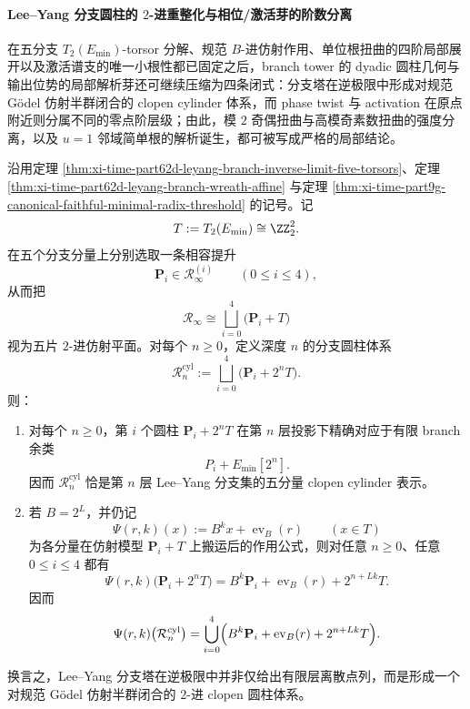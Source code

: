 \paragraph{Lee--Yang 分支圆柱的 \texorpdfstring{$2$}{2}-进重整化与相位/激活芽的阶数分离}
在五分支 \(T_2(E_{\min})\)-torsor 分解、规范 \(B\)-进仿射作用、单位根扭曲的四阶局部展开以及激活谱支的唯一小根性都已固定之后，branch tower 的 dyadic 圆柱几何与输出位势的局部解析芽还可继续压缩为四条闭式：分支塔在逆极限中形成对规范 Gödel 仿射半群闭合的 clopen cylinder 体系，而 phase twist 与 activation 在原点附近则分属不同的零点阶层级；由此，模 \(2\) 奇偶扭曲与高模奇素数扭曲的强度分离，以及 \(u=1\) 邻域简单根的解析诞生，都可被写成严格的局部结论。

\begin{theorem}\label{thm:xi-time-part62dg-leyang-cylinder-affine-renormalization}
沿用定理 \ref{thm:xi-time-part62d-leyang-branch-inverse-limit-five-torsors}、定理 \ref{thm:xi-time-part62d-leyang-branch-wreath-affine} 与定理 \ref{thm:xi-time-part9g-canonical-faithful-minimal-radix-threshold} 的记号。记
\[
T:=T_2(E_{\min})\cong \ZZ_2^2.
\]
在五个分支分量上分别选取一条相容提升
\[
\mathbf P_i\in \mathcal R_\infty^{(i)}
\qquad (0\le i\le 4),
\]
从而把
\[
\mathcal R_\infty
\cong
\bigsqcup_{i=0}^{4}\bigl(\mathbf P_i+T\bigr)
\]
视为五片 \(2\)-进仿射平面。对每个 \(n\ge 0\)，定义深度 \(n\) 的分支圆柱体系
\[
\mathcal R_n^{\mathrm{cyl}}
:=
\bigsqcup_{i=0}^{4}\bigl(\mathbf P_i+2^nT\bigr).
\]
则：
\begin{enumerate}
  \item 对每个 \(n\ge 0\)，第 \(i\) 个圆柱 \(\mathbf P_i+2^nT\) 在第 \(n\) 层投影下精确对应于有限 branch 余类
  \[
  P_i+E_{\min}[2^n].
  \]
  因而 \(\mathcal R_n^{\mathrm{cyl}}\) 恰是第 \(n\) 层 Lee--Yang 分支集的五分量 clopen cylinder 表示。
  \item 若 \(B=2^L\)，并仍记
  \[
  \Psi(r,k)(x):=B^k x+\operatorname{ev}_B(r)
  \qquad (x\in T)
  \]
  为各分量在仿射模型 \(\mathbf P_i+T\) 上搬运后的作用公式，则对任意 \(n\ge 0\)、任意 \(0\le i\le 4\) 都有
  \[
  \Psi(r,k)\bigl(\mathbf P_i+2^nT\bigr)
  =
  B^k\mathbf P_i+\operatorname{ev}_B(r)+2^{n+Lk}T.
  \]
  因而
  \[
  \Psi(r,k)\bigl(\mathcal R_n^{\mathrm{cyl}}\bigr)
  =
  \bigcup_{i=0}^{4}
  \Bigl(
  B^k\mathbf P_i+\operatorname{ev}_B(r)+2^{n+Lk}T
  \Bigr).
  \]
\end{enumerate}
换言之，Lee--Yang 分支塔在逆极限中并非仅给出有限层离散点列，而是形成一个对规范 Gödel 仿射半群闭合的 \(2\)-进 clopen 圆柱体系。
\end{theorem}
